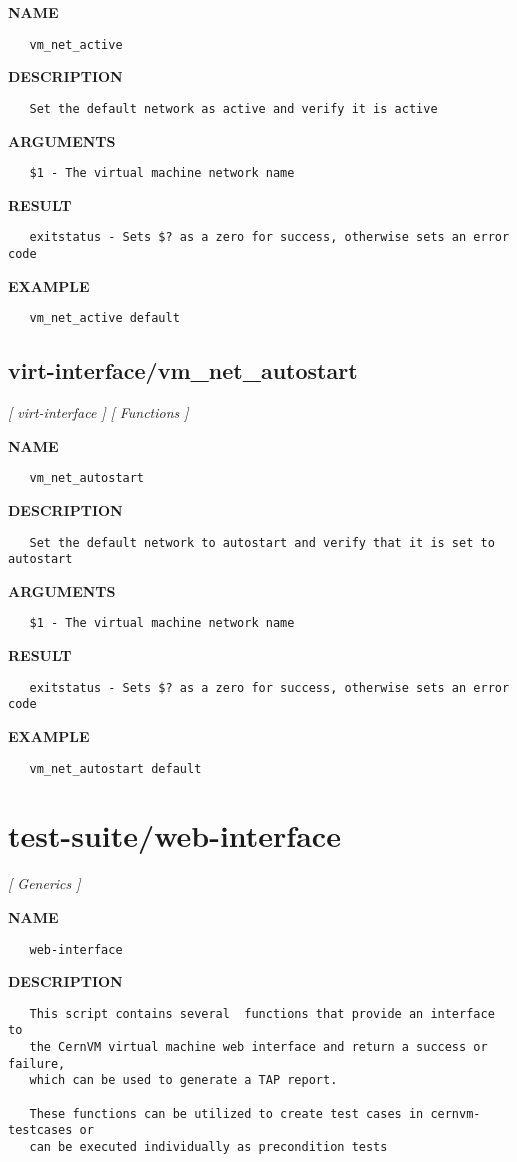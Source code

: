 \label{ch:robo65}
\label{ch:virt_interface_vm_net_active}
\textbf{NAME}
\begin{verbatim}
   vm_net_active
\end{verbatim}
\textbf{DESCRIPTION}
\begin{verbatim}
   Set the default network as active and verify it is active
\end{verbatim}
\textbf{ARGUMENTS}
\begin{verbatim}
   $1 - The virtual machine network name
\end{verbatim}
\textbf{RESULT}
\begin{verbatim}
   exitstatus - Sets $? as a zero for success, otherwise sets an error code
\end{verbatim}
\textbf{EXAMPLE}
\begin{verbatim}
   vm_net_active default
\end{verbatim}
\newpage
\subsection{virt-interface/vm\_net\_autostart}
\textsl{[ virt-interface ]}
\textsl{[ Functions ]}

\label{ch:robo66}
\label{ch:virt_interface_vm_net_autostart}
\textbf{NAME}
\begin{verbatim}
   vm_net_autostart
\end{verbatim}
\textbf{DESCRIPTION}
\begin{verbatim}
   Set the default network to autostart and verify that it is set to autostart
\end{verbatim}
\textbf{ARGUMENTS}
\begin{verbatim}
   $1 - The virtual machine network name
\end{verbatim}
\textbf{RESULT}
\begin{verbatim}
   exitstatus - Sets $? as a zero for success, otherwise sets an error code
\end{verbatim}
\textbf{EXAMPLE}
\begin{verbatim}
   vm_net_autostart default
\end{verbatim}
\newpage
\section{test-suite/web-interface}
\textsl{[ Generics ]}

\label{ch:robo45}
\label{ch:test_suite_web_interface}
\textbf{NAME}
\begin{verbatim}
   web-interface
\end{verbatim}
\textbf{DESCRIPTION}
\begin{verbatim}
   This script contains several  functions that provide an interface to
   the CernVM virtual machine web interface and return a success or failure, 
   which can be used to generate a TAP report.

   These functions can be utilized to create test cases in cernvm-testcases or 
   can be executed individually as precondition tests
\end{verbatim}
\newpage
